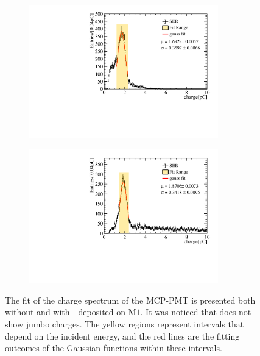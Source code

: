 \begin{figure}[!ht]
	\centering
	\begin{subfigure}[b]{0.5\textwidth}
		\centering
		\includegraphics[width=0.9\textwidth]{PMTRelated/GTmodel/fit_noald.pdf}
		\caption{}
		\label{fig:gain_noald}
	\end{subfigure}%
	\hfill
	\begin{subfigure}[b]{0.5\textwidth}
		\centering
		\includegraphics[width=0.9\textwidth]{PMTRelated/GTmodel/fit_ald.pdf}
		\caption{}
		\label{fig:gain_ald}
	\end{subfigure}

	\caption{The fit of the charge spectrum of the MCP-PMT is presented both without  and with  - deposited on $\mathrm{M}1$. It was noticed that  does not show jumbo charges. The yellow regions represent intervals that depend on the incident energy, and the red lines are the fitting outcomes of the Gaussian functions within these intervals.
	}
	\label{fig:gain_fit}
\end{figure}

